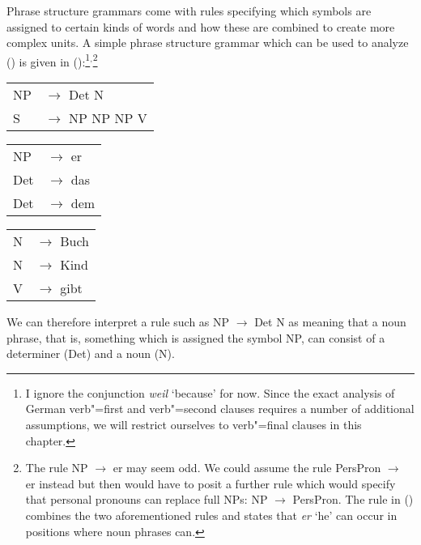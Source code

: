 Phrase structure grammars come with rules specifying which symbols are assigned to certain kinds of words and how these are combined to create more
complex units. A simple phrase structure grammar which can be used to analyze () is given in ():\footnote{%
	I ignore the conjunction \emph{weil} `because' for now. Since the exact analysis of
        German verb"=first and verb"=second clauses requires a number of additional assumptions, we will restrict ourselves to verb"=final clauses in this chapter.
}$^,$\footnote{\label{fn-np-pron-ps-rule}%
	The rule NP $\to$ er may seem odd. We could assume the rule PersPron $\to$ er instead but then would have to posit a further rule which
	would specify that personal pronouns can replace full NPs: NP $\to$ PersPron. The rule in () combines the two aforementioned rules and states
	that \emph{er} `he' can occur in positions where noun phrases can.
}
\ea
\label{bsp-grammatik-psg}
\begin{tabular}[t]{@{}l@{ }l}
{NP} & {$\to$ Det N}\\          
{S}  & {$\to$ NP NP NP V}
\end{tabular}\hspace{2cm}%
\begin{tabular}[t]{@{}l@{ }l}
{NP} & {$\to$ er}\\
{Det}  & {$\to$ das}\\
{Det}  & {$\to$ dem}\\
\end{tabular}\hspace{8mm}
\begin{tabular}[t]{@{}l@{ }l}
{N} & {$\to$ Buch}\\
{N} & {$\to$ Kind}\\
{V} & {$\to$ gibt}\\
\end{tabular}
\z
We can therefore interpret a rule such as NP $\to$\is{$\to$} Det N as meaning that a noun phrase, that is, something which is assigned the symbol NP, can consist
of a determiner (Det) and a noun (N).

